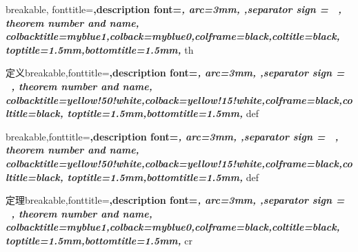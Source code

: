 \newcommand{\df}{\displaystyle \frac} 
\newcommand{\dlim}{\displaystyle \lim}
\newcommand{\dint}{\displaystyle \int}
\newcommand{\ra}{\rangle}
\newcommand{\la}{\langle}
\newcommand{\inner}[2]{{\langle #1,#2\rangle}}
\newcommand{\x}{\mathbf{x}}
\newcommand{\xt}{\mathbf{x}^{\mathsf{T}}}
\newcommand{\T}{{\mathsf{T}}}
\newcommand{\abf}{\mathbf{a}}
\newcommand{\abft}{\mathbf{a}^{\mathsf{T}}}
\newcommand{\R}{\mathbb{R}}
\newcommand{\C}{\mathbb{C}}
\newcommand{\E}{\mathrm{e}}
\newcommand{\F}{\mathbb{F}}
\newcommand{\X}{\mathbf{X}}
\newcommand{\Y}{\mathbf{Y}}
\newcommand{\f}{\mathbf{f}}
\newcommand{\U}{\mathbf{u}}
\newcommand{\D}{\mathrm{d}}
\newcommand{\MCG}{\mathcal{G}}
\newcommand{\MCF}{\mathcal{F}}
\newcommand{\M}{\mathcal{M}}
\newcommand{\MCB}{\mathcal{B}}
\newcommand{\MCT}{\mathcal{T}}
\newcommand{\LL}{\mathcal{L}}
\newcommand{\nullspace}{\mathrm{null}}
\newcommand{\range}{\mathrm{range}}
\newcommand{\Sum}[2]{{\sum_{#1}^{#2}}}
\newcommand{\Union}[2]{{\bigcup_{#1}^{#2}}}
\newcommand{\Intersection}[2]{{\bigcap_{#1}^{#2}}}

\newcommand{\pd}[1]{\frac{\partial}{\partial #1}}
{
	breakable,
	fonttitle=\bfseries\upshape,description font=\bfseries\itshape,
	arc=3mm, ,separator sign = \ ,
	theorem number and name,
	colbacktitle=myblue1,colback=myblue0,colframe=black,coltitle=black,
	toptitle=1.5mm,bottomtitle=1.5mm, 
}{th}

%
  {定义}{breakable,fonttitle=\bfseries\upshape,description font=\bfseries\itshape,
     arc=3mm, ,separator sign = \ ,
     theorem number and name,
     colbacktitle=yellow!50!white,colback=yellow!15!white,colframe=black,coltitle=black,
     toptitle=1.5mm,bottomtitle=1.5mm,
     }{def}
     
%
  {}{breakable,fonttitle=\bfseries\upshape,description font=\bfseries\itshape,
     arc=3mm, ,separator sign = \ ,
     theorem number and name,
     colbacktitle=yellow!50!white,colback=yellow!15!white,colframe=black,coltitle=black,
     toptitle=1.5mm,bottomtitle=1.5mm,
     }{def}

%
  {定理}{breakable,fonttitle=\bfseries\upshape,description font=\bfseries\itshape,
     arc=3mm, ,separator sign = \ ,
     theorem number and name,
     colbacktitle=myblue1,colback=myblue0,colframe=black,coltitle=black,
     toptitle=1.5mm,bottomtitle=1.5mm,
     }{cr}
     
